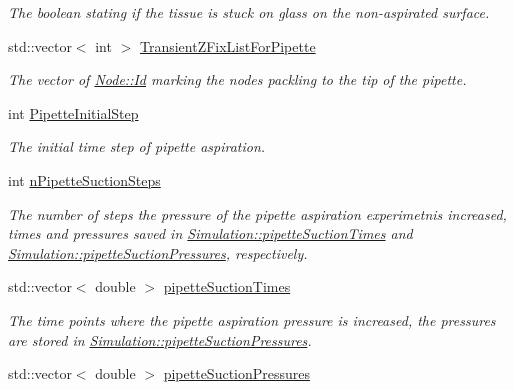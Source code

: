 \begin{DoxyCompactItemize}
\begin{DoxyCompactList}\small\item\em The boolean stating if the tissue is stuck on glass on the non-\/aspirated surface. \end{DoxyCompactList}\item 
\hypertarget{classSimulation_a24de4a27428b8a8d6c80a02d43186df8}{}std\+::vector$<$ int $>$ \hyperlink{classSimulation_a24de4a27428b8a8d6c80a02d43186df8}{Transient\+Z\+Fix\+List\+For\+Pipette}\label{classSimulation_a24de4a27428b8a8d6c80a02d43186df8}

\begin{DoxyCompactList}\small\item\em The vector of \hyperlink{classNode_a1bd379569cc1a8b96432e61971aed4d9}{Node\+::\+Id} marking the nodes packling to the tip of the pipette. \end{DoxyCompactList}\item 
\hypertarget{classSimulation_ab3f29a12d0630213fe58e14a0e198ca0}{}int \hyperlink{classSimulation_ab3f29a12d0630213fe58e14a0e198ca0}{Pipette\+Initial\+Step}\label{classSimulation_ab3f29a12d0630213fe58e14a0e198ca0}

\begin{DoxyCompactList}\small\item\em The initial time step of pipette aspiration. \end{DoxyCompactList}\item 
\hypertarget{classSimulation_a54a1f04e643d462d60644fef64fd7416}{}int \hyperlink{classSimulation_a54a1f04e643d462d60644fef64fd7416}{n\+Pipette\+Suction\+Steps}\label{classSimulation_a54a1f04e643d462d60644fef64fd7416}

\begin{DoxyCompactList}\small\item\em The number of steps the pressure of the pipette aspiration experimetnis increased, times and pressures saved in \hyperlink{classSimulation_ae9b603670a57de082f3c87615eed3822}{Simulation\+::pipette\+Suction\+Times} and \hyperlink{classSimulation_a53bcf3b46795c52fd209a52d326db783}{Simulation\+::pipette\+Suction\+Pressures}, respectively. \end{DoxyCompactList}\item 
\hypertarget{classSimulation_ae9b603670a57de082f3c87615eed3822}{}std\+::vector$<$ double $>$ \hyperlink{classSimulation_ae9b603670a57de082f3c87615eed3822}{pipette\+Suction\+Times}\label{classSimulation_ae9b603670a57de082f3c87615eed3822}

\begin{DoxyCompactList}\small\item\em The time points where the pipette aspiration pressure is increased, the pressures are stored in \hyperlink{classSimulation_a53bcf3b46795c52fd209a52d326db783}{Simulation\+::pipette\+Suction\+Pressures}. \end{DoxyCompactList}\item 
\hypertarget{classSimulation_a53bcf3b46795c52fd209a52d326db783}{}std\+::vector$<$ double $>$ \hyperlink{classSimulation_a53bcf3b46795c52fd209a52d326db783}{pipette\+Suction\+Pressures}\label{classSimulation_a53bcf3b46795c52fd209a52d326db783}


\end{DoxyCompactItemize}
